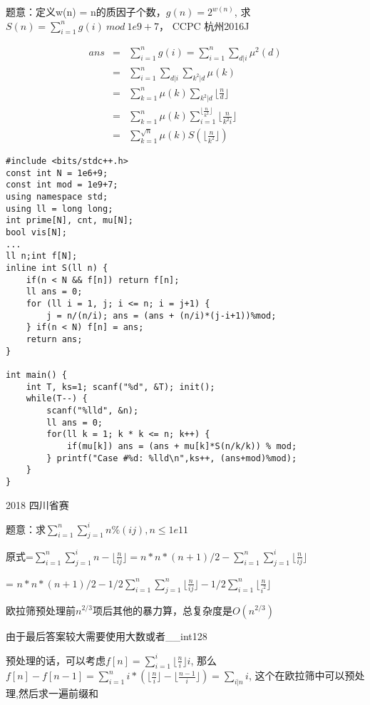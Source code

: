 题意：定义w(n) = n的质因子个数，$g(n)=2^{w(n)}$, 求$S(n) = \sum_{i=1}^{n}g(i)\  mod\  1e9+7$，
CCPC 杭州2016J


\begin{eqnarray*} ans&=&\sum_{i=1}^ng(i) = \sum_{i=1}^n\sum_{d|i}\mu^2(d)\\ &=&\sum_{i=1}^n\sum_{d|i}\sum_{k^2|d}\mu(k)\\ &=&\sum_{k=1}^n\mu(k)\sum_{k^2|d}\lfloor\frac{n}{d}\rfloor\\ &=&\sum_{k=1}^n\mu(k)\sum_{i=1}^{\lfloor\frac{n}{k^2}\rfloor}\lfloor\frac{n}{k^2i}\rfloor\\ &=&\sum_{k=1}^{\sqrt{n}}\mu(k)S(\lfloor\frac{n}{k^2}\rfloor) \end{eqnarray*} 


\begin{lstlisting}
#include <bits/stdc++.h>
const int N = 1e6+9;
const int mod = 1e9+7;
using namespace std;
using ll = long long;
int prime[N], cnt, mu[N];
bool vis[N];
...
ll n;int f[N];
inline int S(ll n) {
    if(n < N && f[n]) return f[n];
    ll ans = 0;
    for (ll i = 1, j; i <= n; i = j+1) {
        j = n/(n/i); ans = (ans + (n/i)*(j-i+1))%mod;
    } if(n < N) f[n] = ans;
    return ans;
}

int main() {
    int T, ks=1; scanf("%d", &T); init();
    while(T--) {
        scanf("%lld", &n);
        ll ans = 0;
        for(ll k = 1; k * k <= n; k++) {
            if(mu[k]) ans = (ans + mu[k]*S(n/k/k)) % mod;
        } printf("Case #%d: %lld\n",ks++, (ans+mod)%mod);
    }
}
\end{lstlisting}


2018 四川省赛

题意：求$\sum_{i=1}^n\sum_{j=1}^i n \%(ij), n \le 1e11$

原式=$\sum_{i=1}^n\sum_{j=1}^i n - \lfloor \frac{n}{ij} \rfloor = n*n*(n+1)/2  -\sum_{i=1}^n\sum_{j=1}^i \lfloor \frac{n}{ij} \rfloor$

= $n*n*(n+1)/2  -1/2\sum_{i=1}^n\sum_{j=1}^n \lfloor \frac{n}{ij} \rfloor - 1/2\sum_{i=1}^n \lfloor \frac{n}{i^2} \rfloor $  

欧拉筛预处理前$n^{2/3}$项后其他的暴力算，总复杂度是$O(n^{2/3})$

由于最后答案较大需要使用大数或者\_\_int128

预处理的话，可以考虑$f[n] = \sum_{i=1}^i \lfloor \frac{n}{i}\rfloor i$, 那么$f[n]-f[n-1] = \sum_{i=1}^n i*( \lfloor \frac{n}{i}\rfloor -  \lfloor \frac{n-1}{i}\rfloor) = \sum_{i|n}i$, 这个在欧拉筛中可以预处理,然后求一遍前缀和

